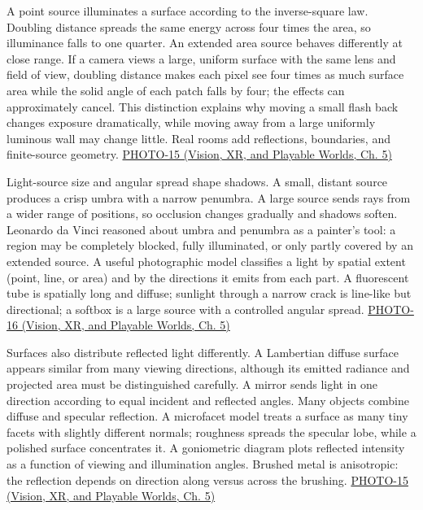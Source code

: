 A point source illuminates a surface according to the inverse-square law. Doubling distance spreads the same energy across four times the area, so illuminance falls to one quarter. An extended area source behaves differently at close range. If a camera views a large, uniform surface with the same lens and field of view, doubling distance makes each pixel see four times as much surface area while the solid angle of each patch falls by four; the effects can approximately cancel. This distinction explains why moving a small flash back changes exposure dramatically, while moving away from a large uniformly luminous wall may change little. Real rooms add reflections, boundaries, and finite-source geometry. \href{../07-Vision-XR-and-Playable-Worlds/main.pdf\#nameddest=04-visual-computing-ii-ch036-photo-15---photography-session-15}{PHOTO-15 (Vision, XR, and Playable Worlds, Ch. 5)}

Light-source size and angular spread shape shadows. A small, distant source produces a crisp umbra with a narrow penumbra. A large source sends rays from a wider range of positions, so occlusion changes gradually and shadows soften. Leonardo da Vinci reasoned about umbra and penumbra as a painter's tool: a region may be completely blocked, fully illuminated, or only partly covered by an extended source. A useful photographic model classifies a light by spatial extent (point, line, or area) and by the directions it emits from each part. A fluorescent tube is spatially long and diffuse; sunlight through a narrow crack is line-like but directional; a softbox is a large source with a controlled angular spread. \href{../07-Vision-XR-and-Playable-Worlds/main.pdf\#nameddest=04-visual-computing-ii-ch036-photo-16---photography-session-16}{PHOTO-16 (Vision, XR, and Playable Worlds, Ch. 5)}

Surfaces also distribute reflected light differently. A Lambertian diffuse surface appears similar from many viewing directions, although its emitted radiance and projected area must be distinguished carefully. A mirror sends light in one direction according to equal incident and reflected angles. Many objects combine diffuse and specular reflection. A microfacet model treats a surface as many tiny facets with slightly different normals; roughness spreads the specular lobe, while a polished surface concentrates it. A goniometric diagram plots reflected intensity as a function of viewing and illumination angles. Brushed metal is anisotropic: the reflection depends on direction along versus across the brushing. \href{../07-Vision-XR-and-Playable-Worlds/main.pdf\#nameddest=04-visual-computing-ii-ch036-photo-15---photography-session-15}{PHOTO-15 (Vision, XR, and Playable Worlds, Ch. 5)}

